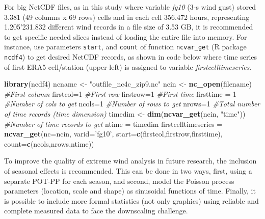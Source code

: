 \documentclass[12pt,twoside]{reedthesis}
\newenvironment{Shaded}{\begin{snugshade}}{\end{snugshade}}
\newcommand{\CommentTok}[1]{\textcolor[rgb]{0.56,0.35,0.01}{\textit{#1}}}
\newcommand{\DataTypeTok}[1]{\textcolor[rgb]{0.13,0.29,0.53}{#1}}
\newcommand{\DecValTok}[1]{\textcolor[rgb]{0.00,0.00,0.81}{#1}}
\newcommand{\KeywordTok}[1]{\textcolor[rgb]{0.13,0.29,0.53}{\textbf{#1}}}
\newcommand{\NormalTok}[1]{#1}
\newcommand{\StringTok}[1]{\textcolor[rgb]{0.31,0.60,0.02}{#1}}
\begin{document}
For big NetCDF files, as in this study where variable \emph{fg10} (3-s wind gust) stored 3.381 (49 columns x 69 rows) cells and in each cell 356.472 hours, representing 1.205'231.832 different wind records in a file size of 3.53 GB, it is recommended to get specific needed slices instead of loading the entire file into memory. For instance, use parameters \texttt{start}, and \texttt{count} of function \texttt{ncvar\_get} (R package \texttt{ncdf4}) to get desired NetCDF records, as shown in code below where time series of first ERA5 cell/station (upper-left) is assigned to variable \emph{firstcelltimeseries}.

\scriptsize

\vspace{0.4cm}
\begin{Shaded}
\begin{Highlighting}[]
    \KeywordTok{library}\NormalTok{(ncdf4)}
\NormalTok{    ncname <-}\StringTok{ "outfile_nc4c_zip9.nc"}
\NormalTok{    ncin <-}\StringTok{ }\KeywordTok{nc_open}\NormalTok{(filename)}
    \CommentTok{#First column}
\NormalTok{      firstcol=}\DecValTok{1}
    \CommentTok{#First row}
\NormalTok{      firstrow=}\DecValTok{1}
    \CommentTok{#First time}
\NormalTok{      firsttime =}\StringTok{ }\DecValTok{1}
    \CommentTok{#Number of cols to get}
\NormalTok{      ncols=}\DecValTok{1}
    \CommentTok{#Number of rows to get}
\NormalTok{      nrows=}\DecValTok{1}
    \CommentTok{#Total number of time records (time dimension)}
\NormalTok{      timedim <-}\StringTok{  }\KeywordTok{dim}\NormalTok{(}\KeywordTok{ncvar_get}\NormalTok{(ncin, }\StringTok{"time"}\NormalTok{))}
    \CommentTok{#Number of time records to get}
\NormalTok{      ntime =}\StringTok{ }\NormalTok{timedim}
\NormalTok{      firstcelltimeseries =}\StringTok{ }\KeywordTok{ncvar_get}\NormalTok{(}\DataTypeTok{nc=}\NormalTok{ncin, }\DataTypeTok{varid=}\StringTok{'fg10'}\NormalTok{, }
                            \DataTypeTok{start=}\KeywordTok{c}\NormalTok{(firstcol,firstrow,firsttime),}
                            \DataTypeTok{count=}\KeywordTok{c}\NormalTok{(ncols,nrows,ntime))}
\end{Highlighting}
\end{Shaded}
\normalsize

To improve the quality of extreme wind analysis in future research, the inclusion of seasonal effects is recommended. This can be done in two ways, first, using a separate POT-PP for each season, and second, model the Poisson process parameters (location, scale and shape) as sinusoidal functions of time. Finally, it is possible to include more formal statistics (not only graphics) using reliable and complete measured data to face the downscaling challenge.
\end{document}
